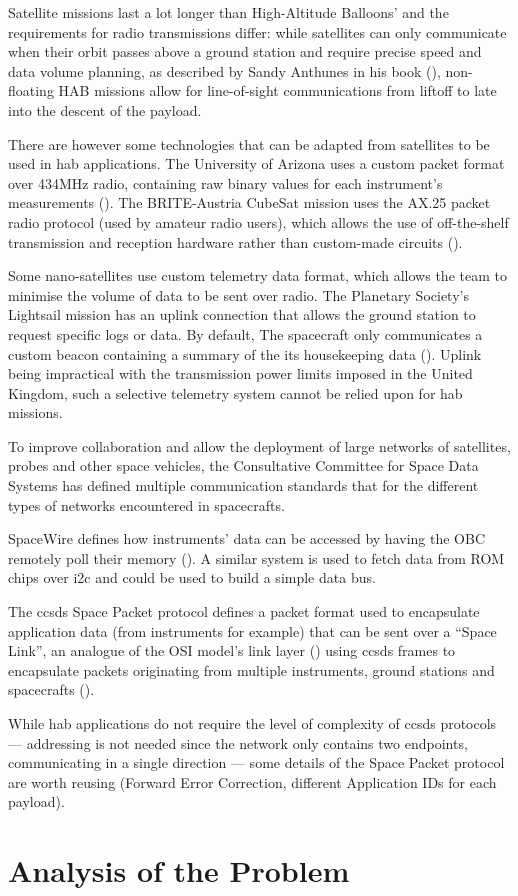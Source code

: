 Satellite missions last a lot longer than High-Altitude Balloons' and the
requirements for radio transmissions differ: while satellites can only
communicate when their orbit passes above a ground station and require precise
speed and data volume planning, as described by Sandy Anthunes in his book
(\cite{Antunes2015}), non-floating HAB missions allow for line-of-sight
communications from liftoff to late into the descent of the payload.

There are however some technologies that can be adapted from satellites to be
used in \acrshort{hab} applications. The University of Arizona uses a custom
packet format over 434MHz radio, containing raw binary values for each
instrument's measurements (\cite{Eatchel2002}). The BRITE-Austria CubeSat
mission uses the AX.25 packet radio protocol (used by amateur radio users),
which allows the use of off-the-shelf transmission and reception hardware
rather than custom-made circuits (\cite{Traussnig2007}).

Some nano-satellites use custom telemetry data format, which allows the team
to minimise the volume of data to be sent over radio. The Planetary Society's
Lightsail mission has an uplink connection that allows the ground station
to request specific logs or data. By default, The spacecraft only communicates
a custom beacon containing a summary of the its housekeeping data
(\cite{planetary2016}). Uplink being impractical with the transmission power
limits imposed in the United Kingdom, such a selective telemetry system cannot
be relied upon for \acrshort{hab} missions.

To improve collaboration and allow the deployment of large networks of
satellites, probes and other space vehicles, the Consultative Committee for
Space Data Systems has defined multiple communication standards that for
the different types of networks encountered in spacecrafts.

SpaceWire defines how instruments' data can be accessed by having the OBC
remotely poll their memory (\cite{parkes2005}). A similar system is used to
fetch data from ROM chips over \acrshort{i2c} and could be used to build a
simple data bus.

The \acrshort{ccsds} Space Packet protocol defines a packet format used to
encapsulate application data (from instruments for example) that can be sent
over a ``Space Link'', an analogue of the OSI model's link layer
(\cite{Stallings1987}) using \acrshort{ccsds} frames to encapsulate packets
originating from multiple instruments, ground stations and spacecrafts
(\cite{ccsds2003}).

While \acrshort{hab} applications do not require the level of complexity of
\acrshort{ccsds} protocols — addressing is not needed since the network only
contains two endpoints, communicating in a single direction — some details of
the Space Packet protocol are worth reusing (Forward Error Correction,
different Application IDs for each payload).

\section{Analysis of the Problem}